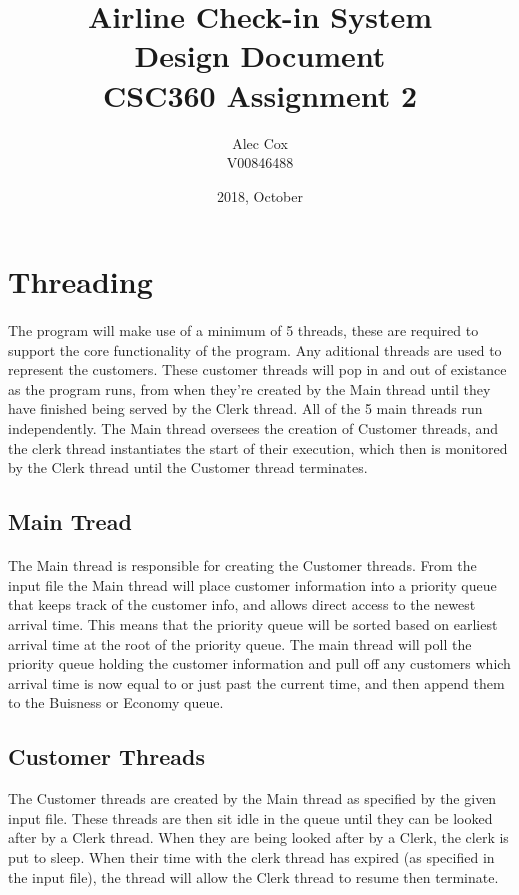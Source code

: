 \documentclass[12pt, letterpaper]{article}
\title{Airline Check-in System\\Design Document\\CSC360 Assignment 2}
\date{2018, October}
\author{Alec Cox\\V00846488}
\begin{document}
\maketitle

\section{Threading}
\paragraph{}
The program will make use of a minimum of 5 threads, these are required to support the core functionality of the program. Any aditional threads are used to represent the customers. These customer threads will pop in and out of existance as the program runs, from when they're created by the Main thread until they have finished being served by the Clerk thread. All of the 5 main threads run independently. The Main thread oversees the creation of Customer threads, and the clerk thread instantiates the start of their execution, which then is monitored by the Clerk thread until the Customer thread terminates.

\subsection{Main Tread}
\paragraph{}
The Main thread is responsible for creating the Customer threads. From the input file the Main thread will place customer information into a priority queue that keeps track of the customer info, and allows direct access to the newest arrival time. This means that the priority queue will be sorted based on earliest arrival time at the root of the priority queue. The main thread will poll the priority queue holding the customer information and pull off any customers which arrival time is now equal to or just past the current time, and then append them to the Buisness or Economy queue.

\subsection{Customer Threads}
The Customer threads are created by the Main thread as specified by the given input file. These threads are then sit idle in the queue until they can be looked after by a Clerk thread. When they are being looked after by a Clerk, the clerk is put to sleep. When their time with the clerk thread has expired (as specified in the input file), the thread will allow the Clerk thread to resume then terminate.
\end{document}
